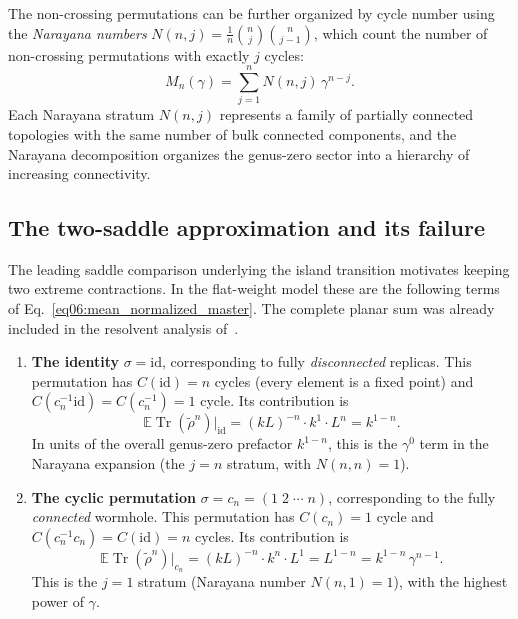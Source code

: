 \documentclass[11pt,letterpaper]{article}
\theoremstyle{plain}
\theoremstyle{definition}
\theoremstyle{remark}
\begin{document}
The non-crossing permutations can be further organized by cycle number using
the \emph{Narayana numbers} $N(n,j) = \frac{1}{n}\binom{n}{j}\binom{n}{j-1}$,
which count the number of non-crossing permutations with exactly $j$ cycles:
\begin{equation}
\label{eq06:narayana_decomposition}
M_n(\gamma) = \sum_{j=1}^{n} N(n,j)\,\gamma^{n-j}.
\end{equation}
Each Narayana stratum $N(n,j)$ represents a family of partially connected
topologies with the same number of bulk connected components, and the Narayana
decomposition organizes the genus-zero sector into a hierarchy of increasing
connectivity.

\subsection{The two-saddle approximation and its failure}
\label{subsec06:two_saddle}

The leading saddle comparison underlying the island transition
\citep{penington2020,almheirietal2019,almheirietal2020islands} motivates keeping
two extreme contractions.  In the flat-weight model these are the following
terms of Eq.~\eqref{eq06:mean_normalized_master}.  The complete planar sum
was already included in the resolvent analysis of~\citet{pssyetal2022}.
\begin{enumerate}
\item \textbf{The identity} $\sigma = \mathrm{id}$, corresponding to fully
  \emph{disconnected} replicas.  This permutation has $C(\mathrm{id}) = n$
  cycles (every element is a fixed point) and $C(c_n^{-1}\mathrm{id}) =
  C(c_n^{-1}) = 1$ cycle.  Its contribution is
  \begin{equation}
  \label{eq06:id_contribution}
  \mathbb E\operatorname{Tr}(\widetilde\rho^n)\big|_{\mathrm{id}} = (kL)^{-n} \cdot k^1 \cdot L^n
    = k^{1-n}.
  \end{equation}
  In units of the overall genus-zero prefactor $k^{1-n}$, this is the $\gamma^0$ term in the Narayana expansion (the $j = n$ stratum, with $N(n,n) = 1$).

\item \textbf{The cyclic permutation} $\sigma = c_n = (1\;2\;\cdots\;n)$,
  corresponding to the fully \emph{connected} wormhole.  This permutation has
  $C(c_n) = 1$ cycle and
  $C(c_n^{-1}c_n) = C(\mathrm{id}) = n$ cycles.  Its contribution is
  \begin{equation}
  \label{eq06:gamma_contribution}
  \mathbb E\operatorname{Tr}(\widetilde\rho^n)\big|_{c_n} = (kL)^{-n} \cdot k^n \cdot L^1
    = L^{1-n} = k^{1-n}\,\gamma^{n-1}.
  \end{equation}
  This is the $j = 1$ stratum (Narayana number $N(n,1) = 1$), with the highest
  power of $\gamma$.
\end{enumerate}
\end{document}
